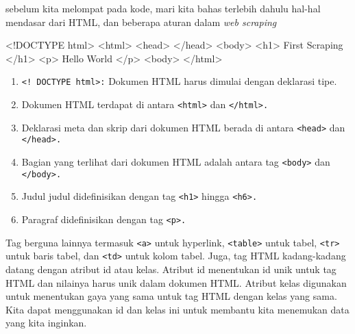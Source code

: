 sebelum kita melompat pada kode, mari kita bahas terlebih dahulu hal-hal mendasar dari HTML, dan beberapa aturan dalam \textit{web scraping}
\begin{algorithm}
<!DOCTYPE html>  
<html>  
    <head>
    </head>
    <body>
        <h1> First Scraping </h1>
        <p> Hello World </p>
    <body>
</html>
\end{algorithm}
\begin{enumerate}

\item \verb|<! DOCTYPE html>:| Dokumen HTML harus dimulai dengan deklarasi tipe.
\item Dokumen HTML terdapat di antara \verb|<html>| dan \verb|</html>.|
\item Deklarasi meta dan skrip dari dokumen HTML berada di antara \verb|<head>| dan \verb|</head>.|
\item Bagian yang terlihat dari dokumen HTML adalah antara tag \verb|<body>| dan \verb|</body>.|
\item Judul judul didefinisikan dengan tag \verb|<h1>| hingga \verb|<h6>.|
\item Paragraf didefinisikan dengan tag \verb|<p>.|
\end{enumerate}

Tag berguna lainnya termasuk \verb|<a>| untuk hyperlink, \verb|<table>| untuk tabel, \verb|<tr>| untuk baris tabel, dan \verb|<td>| untuk kolom tabel. Juga, tag HTML kadang-kadang datang dengan atribut id atau kelas. Atribut id menentukan id unik untuk tag HTML dan nilainya harus unik dalam dokumen HTML. Atribut kelas digunakan untuk menentukan gaya yang sama untuk tag HTML dengan kelas yang sama. Kita dapat menggunakan id dan kelas ini untuk membantu kita menemukan data yang kita inginkan.